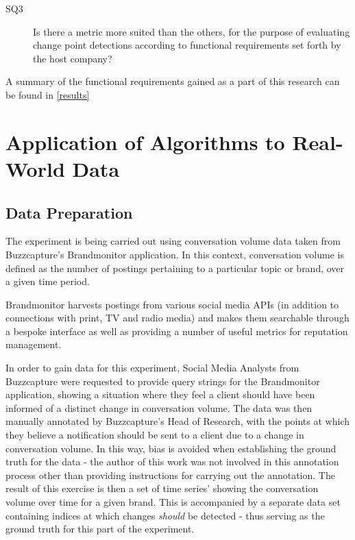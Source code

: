 \documentclass[../main.tex]{subfiles}
\begin{document}
\begin{description}
    \item[SQ3] Is there a metric more suited than the others, for the purpose of evaluating change point detections according to functional requirements set forth by the host company?
\end{description}


A summary of the functional requirements gained as a part of this research can be found in \autoref{results}


\section{Application of Algorithms to Real-World Data}
\label{real world explainer}

\subsection{Data Preparation}

The experiment is being carried out using conversation volume data taken from Buzzcapture's Brandmonitor application. In this context, conversation volume is defined as the number of postings pertaining to a particular topic or brand, over a given time period.

Brandmonitor harvests postings from various social media APIs (in addition to connections with print, TV and radio media) and makes them searchable through a bespoke interface as well as providing a number of useful metrics for reputation management.

In order to gain data for this experiment, Social Media Analysts from Buzzcapture were requested to provide query strings for the Brandmonitor application, showing a situation where they feel a client should have been informed of a distinct change in conversation volume. The data was then manually annotated by Buzzcapture's Head of Research, with the points at which they believe a notification should be sent to a client due to a change in conversation volume. In this way, bias is avoided when establishing the ground truth for the data - the author of this work was not involved in this annotation process other than providing instructions for carrying out the annotation. The result of this exercise is then a set of time series' showing the conversation volume over time for a given brand. This is accompanied by a separate data set containing indices at which changes \emph{should} be detected - thus serving as the ground truth for this part of the experiment.
\end{document}
